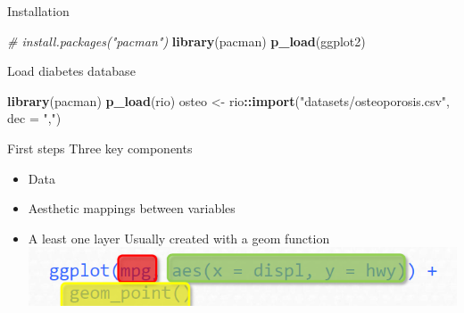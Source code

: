 \documentclass[
  ignorenonframetext,
]{beamer}
\newenvironment{Shaded}{\begin{snugshade}}{\end{snugshade}}
\newcommand{\AttributeTok}[1]{\textcolor[rgb]{0.13,0.29,0.53}{#1}}
\newcommand{\CommentTok}[1]{\textcolor[rgb]{0.56,0.35,0.01}{\textit{#1}}}
\newcommand{\FunctionTok}[1]{\textcolor[rgb]{0.13,0.29,0.53}{\textbf{#1}}}
\newcommand{\NormalTok}[1]{#1}
\newcommand{\OtherTok}[1]{\textcolor[rgb]{0.56,0.35,0.01}{#1}}
\newcommand{\SpecialCharTok}[1]{\textcolor[rgb]{0.81,0.36,0.00}{\textbf{#1}}}
\newcommand{\StringTok}[1]{\textcolor[rgb]{0.31,0.60,0.02}{#1}}
\begin{document}
\begin{frame}[fragile]{Installation}
\label{installation}
\begin{Shaded}
\begin{Highlighting}[]
\CommentTok{\# install.packages("pacman")}
\FunctionTok{library}\NormalTok{(pacman)}
\FunctionTok{p\_load}\NormalTok{(ggplot2)}
\end{Highlighting}
\end{Shaded}
\end{frame}

\begin{frame}[fragile]{Load diabetes database}
\label{load-diabetes-database}
\begin{Shaded}
\begin{Highlighting}[]
\FunctionTok{library}\NormalTok{(pacman)}
\FunctionTok{p\_load}\NormalTok{(rio)}
\NormalTok{osteo }\OtherTok{\textless{}{-}}\NormalTok{ rio}\SpecialCharTok{::}\FunctionTok{import}\NormalTok{(}\StringTok{"datasets/osteoporosis.csv"}\NormalTok{, }\AttributeTok{dec =} \StringTok{","}\NormalTok{)}
\end{Highlighting}
\end{Shaded}
\end{frame}

\begin{frame}{First steps}
\label{first-steps}
Three key components

\begin{itemize}
\item
  Data
\item
  Aesthetic mappings between variables
\item
  A least one layer Usually created with a geom function
  \includegraphics{images/basic_ggplot.png}
\end{itemize}
\end{frame}
\end{document}
